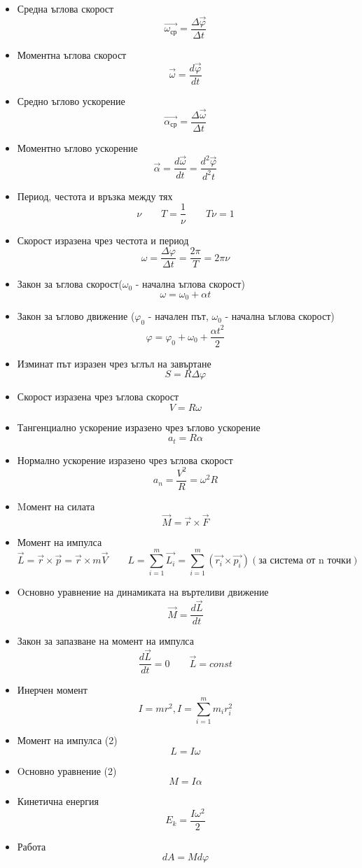\documentclass[fleqn, 12pt]{article}
\theoremstyle{definition}
\begin{document}
\begin{itemize}
\item Средна ъглова скорост
$$\vec{\omega_{\text{ср}}} = \frac{\Delta \vec{\varphi}}{\Delta t}$$
\item Моментна ъглова скорост
$$\vec{\omega} = \frac{d\vec{\varphi}}{dt}$$
\item Средно ъглово ускорение
$$\vec{\alpha_{\text{ср}}} = \frac{\Delta \vec{\omega}}{\Delta t}$$
\item Моментно ъглово ускорение
$$\vec{\alpha} = \frac{d\vec{\omega}}{dt} = \frac{d^2 \vec{\varphi}}{d^2 t}$$
\item Период, честота и връзка между тях
$$\nu \qquad T = \frac{1}{\nu} \qquad T\nu = 1$$
\item Скорост изразена чрез честота и период
$$\omega = \frac{\Delta \varphi}{\Delta t} = \frac{2 \pi }{T} = 2 \pi \nu$$
\item Закон за ъглова скорост($\omega_0$ - начална ъглова скорост)
$$\omega = \omega_0 + \alpha t$$
\item Закон за ъглово движение ($\varphi_0$ - начален път, $\omega_0$ - начална ъглова скорост)
$$\varphi = \varphi_0 + \omega_0 + \frac{\alpha t^2}{2}$$
\item Изминат път изразен чрез ъглъл на завъртане
$$S = R \Delta \varphi $$
\item Скорост изразена чрез ъглова скорост
$$V = R \omega$$
\item Тангенциално ускорение изразено чрез ъглово ускорение
$$a_t = R \alpha$$
\item Нормално ускорение изразено чрез ъглова скорост
$$a_n = \frac{V^2}{R} = \omega^2 R$$
\item Mомент на силата
$$\vec{M} = \vec{r} \times \vec{F}$$
\item Момент на импулса 
$$\vec{L} = \vec{r} \times \vec{p} = \vec{r} \times m \vec{V} \qquad L = \sum_{i=1} ^m \vec{L_i} = \sum_{i=1} ^m \left( \vec{r_i} \times \vec{p_i}\right) (\text{за система от n точки})$$
\item Oсновно уравнение на динамиката на въртеливи движение
$$\vec{M} = \frac{d \vec{L}}{dt}$$
\item Закон за запазване на момент на импулса
$$\frac{d \vec{L}}{dt} = 0 \qquad \vec{L} = const$$
\item Инерчен момент
$$I = mr^2, I = \sum_{i=1} ^m m_i r_i ^2$$
\item Момент на импулса (2)
$$L = I \omega$$
\item Oсновно уравнение (2)
$$M = I \alpha$$
\item Кинетична енергия 
$$E_k = \frac{I \omega^2}{2}$$
\item Работа
$$dA = M d\varphi$$
\end{itemize}
\end{document}
